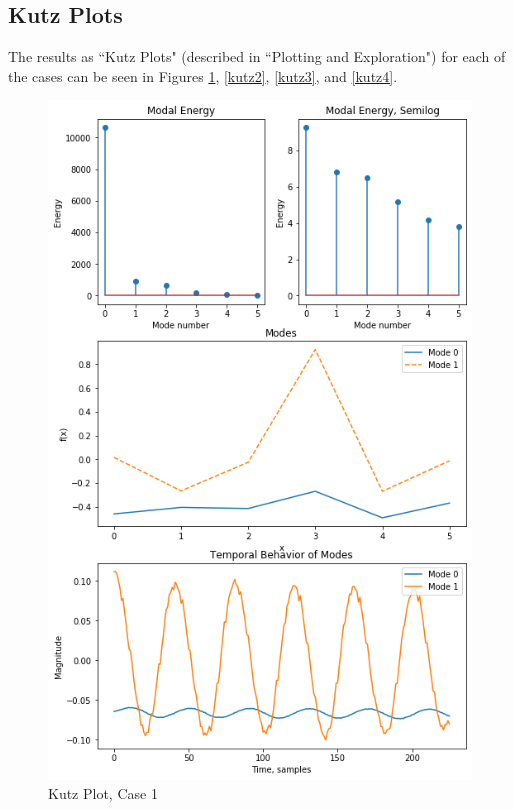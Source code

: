 \documentclass[journal]{IEEEtran}
\begin{document}
\subsection{Kutz Plots}
The results as ``Kutz Plots" (described in ``Plotting and Exploration") for each of the cases can 
be seen in Figures \ref{kutz1}, \ref{kutz2}, \ref{kutz3}, and \ref{kutz4}.

\begin{figure}
	\centerline{\includegraphics[width=\columnwidth]{kutz1.png}}
	\caption{Kutz Plot, Case 1}
	\label{kutz1}
\end{figure}
\end{document}
